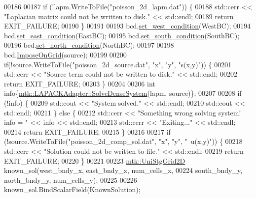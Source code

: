 \begin{DoxyCode}
00186 
00187   \textcolor{keywordflow}{if} (!lapm.WriteToFile(\textcolor{stringliteral}{"poisson\_2d\_lapm.dat"})) \{
00188     std::cerr << \textcolor{stringliteral}{"Laplacian matrix could not be written to disk."} << std::endl;
00189     \textcolor{keywordflow}{return} EXIT\_FAILURE;
00190   \}
00191 
00193   bcd.\hyperlink{classmtk_1_1RobinBCDescriptor2D_aeaff87510dc1773effc0b5429579de23}{set\_west\_condition}(WestBC);
00194   bcd.\hyperlink{classmtk_1_1RobinBCDescriptor2D_a94570f6e741bb00038c4bf81842d226c}{set\_east\_condition}(EastBC);
00195   bcd.\hyperlink{classmtk_1_1RobinBCDescriptor2D_a3fbdf58ba24861011fd852f0c642a4c8}{set\_south\_condition}(SouthBC);
00196   bcd.\hyperlink{classmtk_1_1RobinBCDescriptor2D_ade17884e6a2636a7c6f989602a0052e0}{set\_north\_condition}(NorthBC);
00197 
00198   bcd.\hyperlink{classmtk_1_1RobinBCDescriptor2D_ac9564bc46c196cbf4720a0e4b93da8b0}{ImposeOnGrid}(source);
00199 
00200   \textcolor{keywordflow}{if}(!source.WriteToFile(\textcolor{stringliteral}{"poisson\_2d\_source.dat"}, \textcolor{stringliteral}{"x"}, \textcolor{stringliteral}{"y"}, \textcolor{stringliteral}{"s(x,y)"})) \{
00201     std::cerr << \textcolor{stringliteral}{"Source term could not be written to disk."} << std::endl;
00202     \textcolor{keywordflow}{return} EXIT\_FAILURE;
00203   \}
00204 
00206   \textcolor{keywordtype}{int} info\{\hyperlink{classmtk_1_1LAPACKAdapter_a7428bccf74fd4a4af68fb7233846da22}{mtk::LAPACKAdapter::SolveDenseSystem}(lapm, source)\};
00207 
00208   \textcolor{keywordflow}{if} (!info) \{
00209     std::cout << \textcolor{stringliteral}{"System solved."} << std::endl;
00210     std::cout << std::endl;
00211   \} \textcolor{keywordflow}{else} \{
00212     std::cerr << \textcolor{stringliteral}{"Something wrong solving system! info = "} << info << std::endl;
00213     std::cerr << \textcolor{stringliteral}{"Exiting..."} << std::endl;
00214     \textcolor{keywordflow}{return} EXIT\_FAILURE;
00215   \}
00216 
00217   \textcolor{keywordflow}{if} (!source.WriteToFile(\textcolor{stringliteral}{"poisson\_2d\_comp\_sol.dat"}, \textcolor{stringliteral}{"x"}, \textcolor{stringliteral}{"y"}, \textcolor{stringliteral}{"~u(x,y)"})) \{
00218     std::cerr << \textcolor{stringliteral}{"Solution could not be written to file."} << std::endl;
00219     \textcolor{keywordflow}{return} EXIT\_FAILURE;
00220   \}
00221 
00223   \hyperlink{classmtk_1_1UniStgGrid2D}{mtk::UniStgGrid2D} known\_sol(west\_bndy\_x, east\_bndy\_x, num\_cells\_x,
00224                               south\_bndy\_y, north\_bndy\_y, num\_cells\_y);
00225 
00226   known\_sol.BindScalarField(KnownSolution);

\end{DoxyCode}
